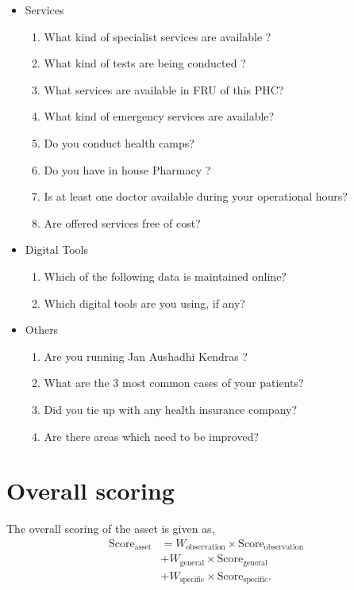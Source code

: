 \documentclass[oneside]{article}
\newcommand{\tsub}[2]{\text{#1}_{\text{#2}}}
\newcommand{\tsubb}[2]{#1_{\text{#2}}}
\begin{document}
\begin{itemize}
\begin{itemize}
\item Services
\begin{enumerate}
\item  What kind of specialist services are available ?
\item  What kind of tests are being conducted ?
\item  What services are available in FRU of this PHC?
\item  What kind of emergency services are available?
\item  Do you conduct health camps?
\item  Do you have in house Pharmacy ?
\item  Is at least one doctor available during your operational hours?
\item  Are offered services free of cost?
\end{enumerate}

\item Digital Tools
\begin{enumerate}
\item  Which of the following data is maintained online?
\item  Which digital tools are you using, if any?
\end{enumerate}

\item Others
\begin{enumerate}
\item  Are you running Jan Aushadhi Kendras ?
\item  What are the 3 most common cases of your patients?
\item  Did you tie up with any health insurance company?
\item  Are there areas which need to be improved?
\end{enumerate}

\end{itemize}

    \end{itemize}
\section{Overall scoring}
The overall scoring of the asset is given as,
\begin{align*}
	\tsub{Score}{asset} &= \tsubb{W}{observation} \times \tsub{Score}{observation} \\
	&+ \tsubb{W}{general} \times \tsub{Score}{general} \\
	&+ \tsubb{W}{specific} \times \tsub{Score}{specific}.
\end{align*}
\end{document}
